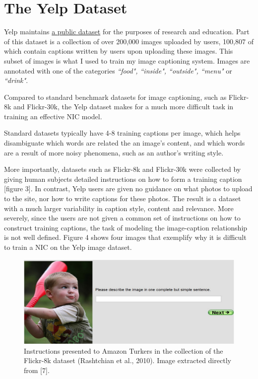 \documentclass[letterpaper, 10 pt, conference]{ieeeconf}
\begin{document}
\section{The Yelp Dataset}

Yelp maintains \href{https://www.yelp.com/dataset}{a public dataset} for the purposes of research and education. Part of this dataset is a collection of over 200,000 images uploaded by users, 100,807 of which contain captions written by users upon uploading these images. This subset of images is what I used to train my image captioning system. Images are annotated with one of the categories \textit{``food", ``inside", ``outside", ``menu"} or \textit{``drink"}.

Compared to standard benchmark datasets for image captioning, such as Flickr-8k and Flickr-30k, the Yelp dataset makes for a much more difficult task in training an effective NIC model.

Standard datasets typically have 4-8 training captions per image, which helps disambiguate which words are related the an image's content, and which words are a result of more noisy phenomena, such as an author's writing style. 

More importantly, datasets such as Flickr-8k and Flickr-30k were collected by giving human subjects detailed instructions on how to form a training caption [figure 3]. In contrast, Yelp users are given no guidance on what photos to upload to the site, nor how to write captions for these photos. The result is a dataset with a much larger variability in caption style, content and relevance. More severely, since the users are not given a common set of instructions on how to construct training captions, the task of modeling the image-caption relationship is not well defined. Figure 4 shows four images that exemplify why it is difficult to train a NIC on the Yelp image dataset. 

\begin{figure}[]
\centering
\includegraphics[width=1\linewidth]{boy}
\caption{Instructions presented to Amazon Turkers in the collection of the Flickr-8k dataset (Rashtchian et al., 2010). Image extracted directly from [7].}
\label{fig:test1}
\end{figure}
\end{document}
